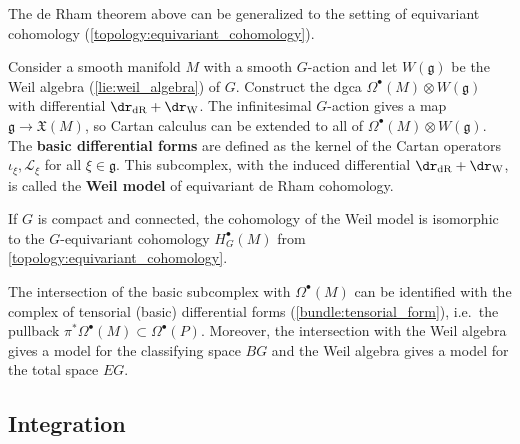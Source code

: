 
    The de Rham theorem above can be generalized to the setting of equivariant cohomology (\cref{topology:equivariant_cohomology}).
    \begin{property}
        Consider a smooth manifold $M$ with a smooth $G$-action and let $W(\mathfrak{g})$ be the Weil algebra (\cref{lie:weil_algebra}) of $G$. Construct the dgca $\Omega^\bullet(M)\otimes W(\mathfrak{g})$ with differential $\dr_\text{dR}+\dr_\text{W}$. The infinitesimal $G$-action gives a map $\mathfrak{g}\rightarrow\mathfrak{X}(M)$, so Cartan calculus can be extended to all of $\Omega^\bullet(M)\otimes W(\mathfrak{g})$. The \textbf{basic differential forms} are defined as the kernel of the Cartan operators $\iota_\xi,\mathcal{L}_\xi$ for all $\xi\in\mathfrak{g}$. This subcomplex, with the induced differential $\dr_\mathrm{dR}+\dr_\text{W}$, is called the \textbf{Weil model} of equivariant de Rham cohomology.

        If $G$ is compact and connected, the cohomology of the Weil model is isomorphic to the $G$-equivariant cohomology $H_G^\bullet(M)$ from \cref{topology:equivariant_cohomology}.
    \end{property}
    \begin{property}
        The intersection of the basic subcomplex with $\Omega^\bullet(M)$ can be identified with the complex of tensorial (basic) differential forms (\cref{bundle:tensorial_form}), i.e.~the pullback $\pi^*\Omega^\bullet(M)\subset\Omega^\bullet(P)$. Moreover, the intersection with the Weil algebra gives a model for the classifying space $BG$ and the Weil algebra gives a model for the total space $EG$.
    \end{property}

\subsection{Integration}

